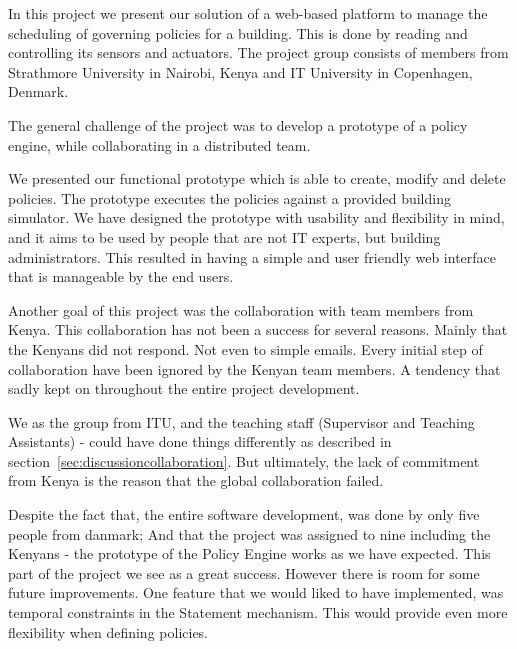 In this project we present our solution of a web-based platform to manage the scheduling of governing policies for a building. This is done by reading and controlling its sensors and actuators. The project group consists of members from Strathmore University in Nairobi, Kenya and IT University in Copenhagen, Denmark.

The general challenge of the project was to develop a prototype of a policy engine, while collaborating in a distributed team. 

We presented our functional prototype which is able to create, modify and delete policies. The prototype executes the policies against a provided building simulator. We have designed the prototype with usability and flexibility in mind, and it aims to be used by people that are not IT experts, but building administrators. This resulted in having a simple and user friendly web interface that is manageable by the end users. 

Another goal of this project was the collaboration with team members from Kenya. This collaboration has not been a success for several reasons. Mainly that the Kenyans did not respond. Not even to simple emails. Every initial step of collaboration have been ignored by the Kenyan team members. A tendency that sadly kept on throughout the entire project development.

We as the group from ITU, and the teaching staff (Supervisor and Teaching Assistants) - could have done things differently as described in section~\ref{sec:discussioncollaboration}. But ultimately, the lack of commitment from Kenya is the reason that the global collaboration failed.

Despite the fact that, the entire software development, was done by only five people from danmark; And that the project was assigned to nine including the Kenyans  - the prototype of the Policy Engine works as we have expected. This part of the project we see as a great success. However there is room for some future improvements. One feature that we would liked to have implemented, was temporal constraints in the Statement mechanism. This would provide even more flexibility when defining policies.





